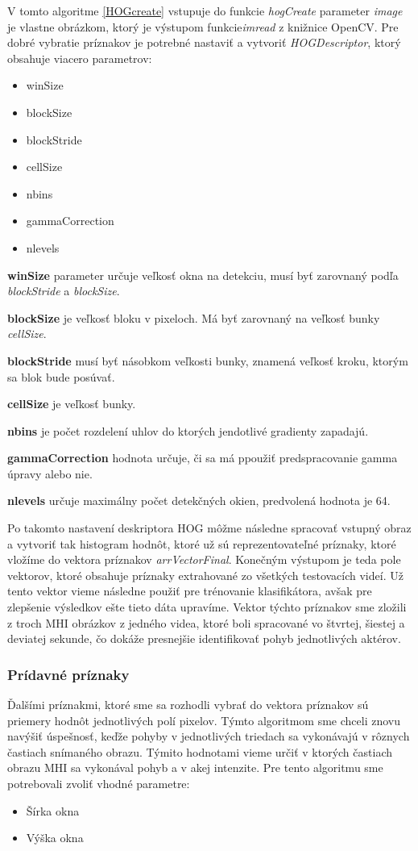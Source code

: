 V tomto algoritme \ref{HOGcreate} vstupuje do funkcie \textit{hogCreate} parameter \textit{image} je vlastne obrázkom, ktorý je výstupom funkcie\textit{imread} z knižnice OpenCV. Pre dobré vybratie príznakov je potrebné nastaviť a vytvoriť \textit{HOGDescriptor}, ktorý obsahuje viacero parametrov:

\begin{itemize}
\item winSize
\item blockSize
\item blockStride
\item cellSize
\item nbins
\item gammaCorrection
\item nlevels 
\end{itemize}

\textbf{winSize} parameter určuje veľkosť okna na detekciu, musí byť zarovnaný podľa \textit{blockStride} a \textit{blockSize}.

\textbf{blockSize} je veľkosť bloku v pixeloch. Má byť zarovnaný na veľkosť bunky \textit{cellSize}.

\textbf{blockStride} musí byť násobkom veľkosti bunky, znamená veľkosť kroku, ktorým sa blok bude posúvať.

\textbf{cellSize} je veľkosť bunky.

\textbf{nbins} je počet rozdelení uhlov do ktorých jendotlivé gradienty zapadajú.

\textbf{gammaCorrection} hodnota určuje, či sa má ppoužiť predspracovanie gamma úpravy alebo nie.

\textbf{nlevels} určuje maximálny počet detekčných okien, predvolená hodnota je 64.

Po takomto nastavení deskriptora HOG môžme následne spracovať vstupný obraz a vytvoriť tak histogram hodnôt, ktoré už sú reprezentovateľné príznaky, ktoré vložíme do vektora príznakov \textit{arrVectorFinal}. Konečným výstupom je teda pole vektorov, ktoré obsahuje príznaky extrahované zo všetkých testovacích videí. Už tento vektor vieme následne použiť pre trénovanie klasifikátora, avšak pre zlepšenie výsledkov ešte tieto dáta upravíme. Vektor týchto príznakov sme zložili z troch MHI obrázkov z jedného videa, ktoré boli spracované vo štvrtej, šiestej a deviatej sekunde, čo dokáže presnejšie identifikovať pohyb jednotlivých aktérov.


\subsubsection{Prídavné príznaky} \label{pridavny}
Ďalšími príznakmi, ktoré sme sa rozhodli vybrať do vektora príznakov sú priemery hodnôt jednotlivých polí pixelov. Týmto algoritmom sme chceli znovu navýšiť úspešnosť, keďže pohyby v jednotlivých triedach sa vykonávajú v rôznych častiach snímaného obrazu. Týmito hodnotami vieme určiť v ktorých častiach obrazu MHI sa vykonával pohyb a v akej intenzite. Pre tento algoritmu sme potrebovali zvoliť vhodné parametre: 
\begin{itemize}
\item Šírka okna
\item Výška okna
\end{itemize}

